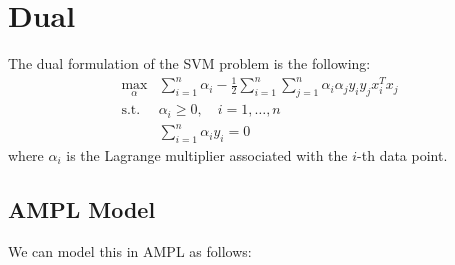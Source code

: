 
\section{Dual}

The dual formulation of the SVM problem is the following:
\begin{align*}
\max_{\alpha} & \sum_{i=1}^n \alpha_i - \frac{1}{2} \sum_{i=1}^n \sum_{j=1}^n \alpha_i \alpha_j y_i y_j x_i^T x_j \\
\text{s.t.} & \alpha_i \geq 0, \quad i = 1, \ldots, n \\
& \sum_{i=1}^n \alpha_i y_i = 0
\end{align*}
where $\alpha_i$ is the Lagrange multiplier associated with the $i$-th data point.

\subsection{AMPL Model}

We can model this in AMPL as follows:

\inputminted{ampl}{../ampl/dual.ampl}
